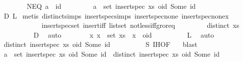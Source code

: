 \begin{isabellebody}
\isanewline
\ \ \ \ \ \ \isamarkupfalse%
\ NEQ{\isacharcolon}\ {\isachardoublequoteopen}a\ {\isasymnoteq}\ id{\isachardoublequoteclose}\isanewline
\ \ \ \ \ \ \isamarkupfalse%
\ {}{\isacharcolon}\ {\isachardoublequoteopen}a\ {\isasymnotin}\ set\ {\isacharparenleft}insert{\isacharunderscore}spec\ xs\ {\isacharparenleft}oid{\isacharcomma}\ Some\ id{\isacharparenright}{\isacharparenright}{\isachardoublequoteclose}\isanewline
\ \ \ \ \ \ \ \ \isamarkupfalse%
\ D\ L\ \isamarkupfalse%
{\isacharparenleft}metis\ distinct{\isachardot}simps{\isacharparenleft}{}{\isacharparenright}\ insert{\isacharunderscore}spec{\isachardot}simps{\isacharparenleft}{}{\isacharparenright}\ insert{\isacharunderscore}spec{\isacharunderscore}none\ insert{\isacharunderscore}spec{\isacharunderscore}nonex\isanewline
\ \ \ \ \ \ \ \ \ \ \ \ insert{\isacharunderscore}spec{\isacharunderscore}set\ insert{\isacharunderscore}iff\ list{\isachardot}set{\isacharparenleft}{}{\isacharparenright}\ not{\isacharunderscore}less{\isacharunderscore}iff{\isacharunderscore}gr{\isacharunderscore}or{\isacharunderscore}eq{\isacharparenright}\isanewline
\ \ \ \ \ \ \isamarkupfalse%
\ {}{\isacharcolon}\ {\isachardoublequoteopen}distinct\ xs{\isachardoublequoteclose}\isanewline
\ \ \ \ \ \ \ \ \isamarkupfalse%
\ D\ \isamarkupfalse%
\ auto\isanewline
\ \ \ \ \ \ \isamarkupfalse%
\ {\isachardoublequoteopen}{\isasymAnd}x{\isachardot}\ x\ {\isasymin}\ set\ xs\ {\isasymLongrightarrow}\ x\ {\isacharless}\ oid{\isachardoublequoteclose}\isanewline
\ \ \ \ \ \ \ \ \isamarkupfalse%
\ L\ \isamarkupfalse%
\ auto\isanewline
\ \ \ \ \ \ \isamarkupfalse%
\ {\isachardoublequoteopen}distinct\ {\isacharparenleft}insert{\isacharunderscore}spec\ xs\ {\isacharparenleft}oid{\isacharcomma}\ Some\ id{\isacharparenright}{\isacharparenright}{\isachardoublequoteclose}\isanewline
\ \ \ \ \ \ \ \ \isamarkupfalse%
\ S\ IH{\isacharbrackleft}OF\ {}{\isacharbrackright}\ \isamarkupfalse%
\ blast\isanewline
\ \ \ \ \ \ \isamarkupfalse%
\ {\isachardoublequoteopen}a\ {\isasymnotin}\ set\ {\isacharparenleft}insert{\isacharunderscore}spec\ xs\ {\isacharparenleft}oid{\isacharcomma}\ Some\ id{\isacharparenright}{\isacharparenright}\ {\isasymand}\ distinct\ {\isacharparenleft}insert{\isacharunderscore}spec\ xs\ {\isacharparenleft}oid{\isacharcomma}\ Some\ id{\isacharparenright}{\isacharparenright}{\isachardoublequoteclose}\isanewline

\end{isabellebody}
